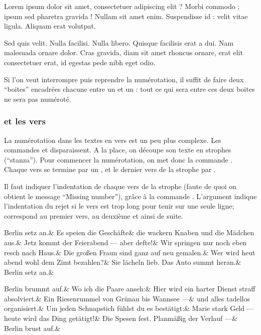\begin{minipage}{10cm}
\beginnumbering
\pstart %
Lorem ipsum dolor sit amet, consectetuer adipiscing elit ?
Morbi commodo ; ipsum sed pharetra gravida !
Nullam sit amet enim. Suspendisse id : velit vitae ligula. 
Aliquam erat volutpat.


Sed quis velit. Nulla facilisi. Nulla libero. 
 Quisque facilisis erat a dui. %
Nam malesuada ornare dolor.
Cras gravida, diam sit amet rhoncus ornare, 
erat  elit consectetuer erat, id egestas pede nibh eget odio.
\pend
\endnumbering
\end{minipage}
\bigbreak

Si l'on veut interrompre puis reprendre la numérotation, il suffit de faire deux \enquote{boites} encadrées chacune entre un   et un :  tout ce qui sera entre ces deux boites ne sera pas numéroté.

\subsubsection{ et les vers}

La  numérotation dans les textes en vers est un peu plus complexe. Les commandes  et  disparaissent. A la place, on découpe son texte en strophes (\enquote{stanza}). Pour commencer la numérotation, on met donc la commande . Chaque vers se termine par un \ampersand , et le dernier vers de la strophe par \cs{\ampersand}.  

Il faut indiquer l'indentation de chaque vers de la strophe (faute de quoi on obtient le message \enquote{Missing number}), grâce à la commande . L'argument  indique l'indentation du rejet si le vers est trop long pour tenir sur une seule ligne;  correspond au premier vers,  au deuxième et ainsi de suite.




\begin{latexcode*}
\beginnumbering
{}
\let\endstanzaextra=\bigbreak
\stanza
Berlin setz an.&
Es speien die Geschäfte&
die wackern Knaben und die Mädchen aus.&
Jetz kommt der Feierabend --- aber defte!&
Wir springen nur noch eben resch nach Haus.&
Die großen Fraun sind ganz auf neu gemalen.&
Wer wird heut abend wohl dem Zimt bezahlen?&
Sie lächeln lieb. Das Auto summt heran.&
Berlin setz an.\&

\stanza
Berlin brummt auf.&
Wo ich die Paare anseh:&
Hier wird ein harter Dienst straff absolviert.&
Ein Riesenrummel von Grünau bis Wannsee ---&
und alles tadellos organisiert.&
Um jeden Schnapstich fühlst du es bestätigt:&
Marie stark Geld --- heute wird das Ding getätigt!&
Die Spesen fest. Planmäßig der Verlauf ---&
Berlin brust auf.\&
\endnumbering
\end{latexcode*}

